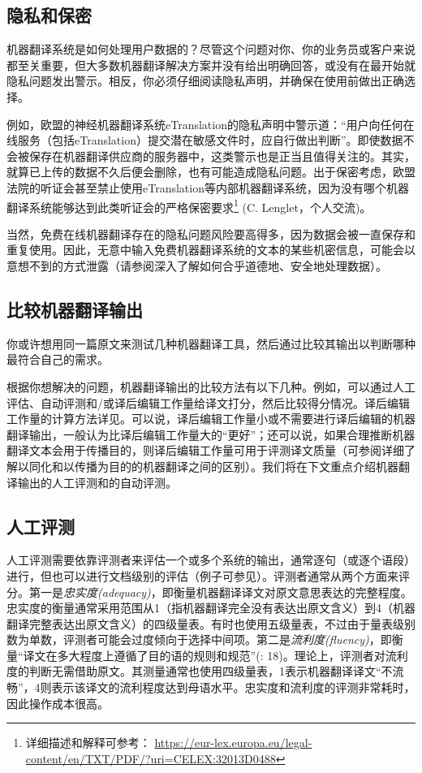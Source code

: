 \documentclass[output=paper]{langscibook}
\begin{document}
\subsection{隐私和保密}
机器翻译系统是如何处理用户数据的？尽管这个问题对你、你的业务员或客户来说都至关重要，但大多数机器翻译解决方案并没有给出明确回答，或没有在最开始就隐私问题发出警示。相反，你必须仔细阅读隐私声明，并确保在使用前做出正确选择。

例如，欧盟的神经机器翻译系统eTranslation的隐私声明中警示道：“用户向任何在线服务（包括eTranslation）提交潜在敏感文件时，应自行做出判断”。即使数据不会被保存在机器翻译供应商的服务器中，这类警示也是正当且值得关注的。其实，就算已上传的数据不久后便会删除，也有可能造成隐私问题。出于保密考虑，欧盟法院的听证会甚至禁止使用eTranslation等内部机器翻译系统，因为没有哪个机器翻译系统能够达到此类听证会的严格保密要求\footnote{详细描述和解释可参考： \url{https://eur-lex.europa.eu/legal-content/en/TXT/PDF/?uri=CELEX:32013D0488}} (C. Lenglet，个人交流)。

当然，免费在线机器翻译存在的隐私问题风险要高得多，因为数据会被一直保存和重复使用。因此，无意中输入免费机器翻译系统的文本的某些机密信息，可能会以意想不到的方式泄露（请参阅深入了解如何合乎道德地、安全地处理数据）。


\subsection{比较机器翻译输出}\largerpage
你或许想用同一篇原文来测试几种机器翻译工具，然后通过比较其输出以判断哪种最符合自己的需求。

根据你想解决的问题，机器翻译输出的比较方法有以下几种。例如，可以通过人工评估、自动评测和/或译后编辑工作量给译文打分，然后比较得分情况。译后编辑工作量的计算方法详见。可以说，译后编辑工作量小或不需要进行译后编辑的机器翻译输出，一般认为比译后编辑工作量大的“更好”；还可以说，如果合理推断机器翻译文本会用于传播目的，则译后编辑工作量可用于评测译文质量（可参阅详细了解以同化和以传播为目的的机器翻译之间的区别）。我们将在下文重点介绍机器翻译输出的人工评测和的自动评测。


\subsection{人工评测}
人工评测需要依靠评测者来评估一个或多个系统的输出，通常逐句（或逐个语段）进行，但也可以进行文档级别的评估（例子可参见\citealt{Castilho2020}）。评测者通常从两个方面来评分。第一是\textit{忠实度(adequacy)}，即衡量机器翻译译文对原文意思表达的完整程度。忠实度的衡量通常采用范围从1（指机器翻译完全没有表达出原文含义）到4（机器翻译完整表达出原文含义）的四级量表。有时也使用五级量表，不过由于量表级别数为单数，评测者可能会过度倾向于选择中间项。第二是\textit{流利度(fluency)}，即衡量“译文在多大程度上遵循了目的语的规则和规范”(\citealt{CastilhoMoorkens2018}: 18)。理论上，评测者对流利度的判断无需借助原文。其测量通常也使用四级量表，1表示机器翻译译文“不流畅”，4则表示该译文的流利程度达到母语水平\citep[1152-1153]{Castilho2020}。忠实度和流利度的评测非常耗时，因此操作成本很高。
\end{document}

